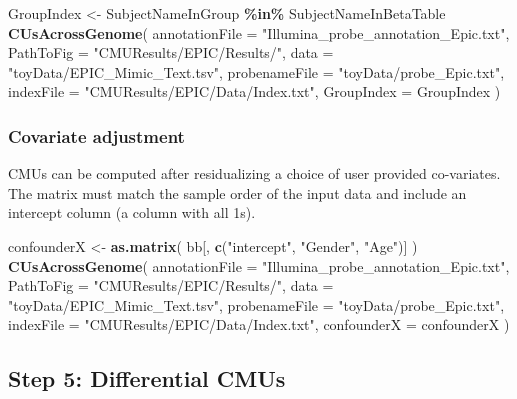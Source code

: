 \documentclass[
]{article}
\newenvironment{Shaded}{\begin{snugshade}}{\end{snugshade}}
\newcommand{\AttributeTok}[1]{\textcolor[rgb]{0.13,0.29,0.53}{#1}}
\newcommand{\FunctionTok}[1]{\textcolor[rgb]{0.13,0.29,0.53}{\textbf{#1}}}
\newcommand{\NormalTok}[1]{#1}
\newcommand{\OtherTok}[1]{\textcolor[rgb]{0.56,0.35,0.01}{#1}}
\newcommand{\SpecialCharTok}[1]{\textcolor[rgb]{0.81,0.36,0.00}{\textbf{#1}}}
\newcommand{\StringTok}[1]{\textcolor[rgb]{0.31,0.60,0.02}{#1}}
\begin{document}
\begin{Shaded}
\begin{Highlighting}[]
\NormalTok{GroupIndex }\OtherTok{\textless{}{-}}\NormalTok{ SubjectNameInGroup }\SpecialCharTok{\%in\%}\NormalTok{ SubjectNameInBetaTable}
\FunctionTok{CUsAcrossGenome}\NormalTok{(}
    \AttributeTok{annotationFile =} \StringTok{"Illumina\_probe\_annotation\_Epic.txt"}\NormalTok{,}
    \AttributeTok{PathToFig =} \StringTok{"CMUResults/EPIC/Results/"}\NormalTok{,}
    \AttributeTok{data =} \StringTok{"toyData/EPIC\_Mimic\_Text.tsv"}\NormalTok{,}
    \AttributeTok{probenameFile =} \StringTok{"toyData/probe\_Epic.txt"}\NormalTok{,}
    \AttributeTok{indexFile =} \StringTok{"CMUResults/EPIC/Data/Index.txt"}\NormalTok{,}
    \AttributeTok{GroupIndex =}\NormalTok{ GroupIndex}
\NormalTok{  )}
\end{Highlighting}
\end{Shaded}

\subsubsection{Covariate adjustment}\label{covariate-adjustment}

CMUs can be computed after residualizing a choice of user provided
co-variates. The matrix must match the sample order of the input data
and include an intercept column (a column with all 1s).

\begin{Shaded}
\begin{Highlighting}[]
\NormalTok{confounderX }\OtherTok{\textless{}{-}} \FunctionTok{as.matrix}\NormalTok{(}
\NormalTok{  bb[, }\FunctionTok{c}\NormalTok{(}\StringTok{"intercept"}\NormalTok{, }\StringTok{"Gender"}\NormalTok{, }\StringTok{"Age"}\NormalTok{)]}
\NormalTok{)}
\FunctionTok{CUsAcrossGenome}\NormalTok{(}
    \AttributeTok{annotationFile =} \StringTok{"Illumina\_probe\_annotation\_Epic.txt"}\NormalTok{,}
    \AttributeTok{PathToFig =} \StringTok{"CMUResults/EPIC/Results/"}\NormalTok{,}
    \AttributeTok{data =} \StringTok{"toyData/EPIC\_Mimic\_Text.tsv"}\NormalTok{,}
    \AttributeTok{probenameFile =} \StringTok{"toyData/probe\_Epic.txt"}\NormalTok{,}
    \AttributeTok{indexFile =} \StringTok{"CMUResults/EPIC/Data/Index.txt"}\NormalTok{,}
    \AttributeTok{confounderX =}\NormalTok{ confounderX}
\NormalTok{  )}
\end{Highlighting}
\end{Shaded}

\subsection{Step 5: Differential CMUs}\label{step5-diffCMU}
\end{document}
